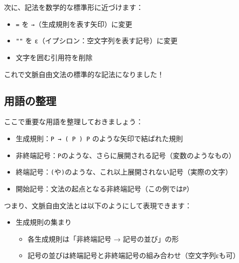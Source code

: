 次に、記法を数学的な標準形に近づけます：

\begin{itemize}
\tightlist
\item
  \texttt{=} を \texttt{→}（生成規則を表す矢印）に変更
\item
  \texttt{""} を \texttt{ε}（イプシロン：空文字列を表す記号）に変更
\item
  文字を囲む引用符を削除
\end{itemize}

\begin{Shaded}
\begin{Highlighting}[]
\end{Highlighting}
\end{Shaded}

これで文脈自由文法の標準的な記法になりました！

\hypertarget{chapter4-ux7528ux8a9eux306eux6574ux7406}{%
\subsection{用語の整理}\label{chapter4-ux7528ux8a9eux306eux6574ux7406}}

ここで重要な用語を整理しておきましょう：

\begin{itemize}
\tightlist
\item
  生成規則：\texttt{P\ →\ (\ P\ )\ P} のような矢印で結ばれた規則
\item
  非終端記号：\texttt{P}のような、さらに展開される記号（変数のようなもの）
\item
  終端記号：\texttt{(}や\texttt{)}のような、これ以上展開されない記号（実際の文字）
\item
  開始記号：文法の起点となる非終端記号（この例では\texttt{P}）
\end{itemize}

つまり、文脈自由文法とは以下のようにして表現できます：

\begin{itemize}
\tightlist
\item
  生成規則の集まり

  \begin{itemize}
  \tightlist
  \item
    各生成規則は「非終端記号 → 記号の並び」の形
  \item
    記号の並びは終端記号と非終端記号の組み合わせ（空文字列εも可）
  \end{itemize}
\end{itemize}

